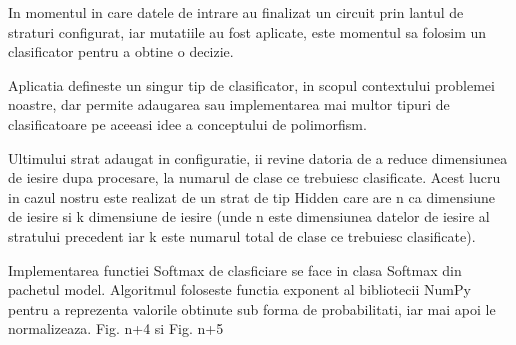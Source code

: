 	In momentul in care datele de intrare au finalizat un circuit prin lantul de straturi configurat, iar mutatiile au fost aplicate, este momentul sa folosim un clasificator pentru a obtine o decizie. 
	
	Aplicatia defineste un singur tip de clasificator, in scopul contextului problemei noastre, dar permite adaugarea sau implementarea mai multor tipuri de clasificatoare pe aceeasi idee a conceptului de polimorfism. 
	
	Ultimului strat adaugat in configuratie, ii revine datoria de a reduce dimensiunea de iesire dupa procesare, la numarul de clase ce trebuiesc clasificate. Acest lucru in cazul nostru este realizat de un strat de tip Hidden care are n ca dimensiune de iesire si k dimensiune de iesire (unde n este dimensiunea datelor de iesire al stratului precedent iar k este numarul total de clase ce trebuiesc clasificate).
	 
	Implementarea functiei Softmax de clasficiare se face in clasa Softmax din pachetul model. Algoritmul foloseste functia exponent al bibliotecii NumPy pentru a reprezenta valorile obtinute sub forma de probabilitati, iar mai apoi le normalizeaza. Fig. n+4 si Fig. n+5
	
	
	
	

